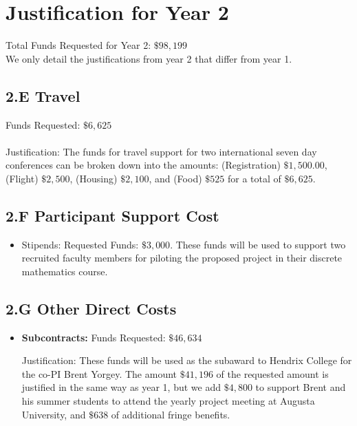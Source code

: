 \documentclass[11pt]{article}
\begin{document}
\section{Justification for Year 2}
\label{sec:justification_for_year_2}

Total Funds Requested for Year 2: $\$98,199$\\

\noindent
We only detail the justifications from year 2 that differ from year 1.

\subsection*{2.E Travel}
\label{subsec:travel}
Funds Requested: $\$6,625$\\ \ \\ Justification: The funds for travel
support for two international seven day conferences can be broken down
into the amounts: (Registration) $\$1,500.00$, (Flight) $\$2,500$,
(Housing) $\$2,100$, and (Food) $\$525$ for a total of $\$6,625$.

\subsection*{2.F Participant Support Cost }
\label{subsec:2.f_participant_support_cost_}
\begin{itemize}
\item Stipends: Requested Funds: $\$3,000$.  These funds will be used
  to support two recruited faculty members for piloting the proposed
  project in their discrete mathematics course.
\end{itemize}

\subsection*{2.G Other Direct Costs}
\label{subsec:other}

\begin{itemize}
\item \textbf{Subcontracts:} Funds Requested: $\$46,634$

  Justification: These funds will be used as the subaward to Hendrix
  College for the co-PI Brent Yorgey.  The amount $\$41,196$ of the
  requested amount is justified in the same way as year 1, but we add
  $\$4,800$ to support Brent and his summer students to attend the
  yearly project meeting at Augusta University, and $\$638$ of
  additional fringe benefits.
\end{itemize}
\end{document}
